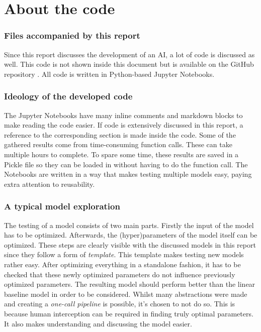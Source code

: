 \part{About the code}
\label{part:about_the_code}


\section{Files accompanied by this report}
\label{section:inc_files}
Since this report discusses the development of an AI, a lot of code is discussed as well.
This code is not shown inside this document but is available on the GitHub repository \citep{github_project}.
All code is written in Python-based Jupyter Notebooks.



\section{Ideology of the developed code}
\label{section:ideology_dev_code}
The Jupyter Notebooks have many inline comments and markdown blocks to make reading the code easier.
If code is extensively discussed in this report, a reference to the corresponding section is made inside the code. 
Some of the gathered results come from time-consuming function calls.
These can take multiple hours to complete.
To spare some time, these results are saved in a Pickle file so they can be loaded in without having to do the function call.
The Notebooks are written in a way that makes testing multiple models easy, paying extra attention to reusability. 


\section{A typical model exploration}
\label{section:typical_model_exploration}
The testing of a model consists of two main parts.
Firstly the input of the model has to be optimized.
Afterwards, the (hyper)parameters of the model itself can be optimized.
These steps are clearly visible with the discussed models in this report since they follow a form of \emph{template}.
This template makes testing new models rather easy.
After optimizing everything in a standalone fashion, it has to be checked that these newly optimized parameters do not influence previously optimized parameters.
The resulting model should perform better than the linear baseline model in order to be considered.
Whilst many abstractions were made and creating a \emph{one-call pipeline} is possible, it's chosen to not do so.
This is because human interception can be required in finding truly optimal parameters.
It also makes understanding and discussing the model easier.


